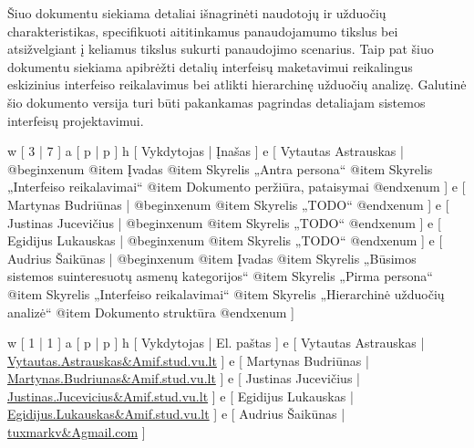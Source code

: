 
Šiuo dokumentu siekiama detaliai išnagrinėti naudotojų ir
užduočių charakteristikas, specifikuoti aititinkamus panaudojamumo
tikslus bei atsižvelgiant į keliamus tikslus sukurti panaudojimo
scenarius. Taip pat šiuo dokumentu siekiama apibrėžti detalių
interfeisų maketavimui reikalingus eskizinius interfeiso reikalavimus
bei atlikti hierarchinę užduočių analizę. Galutinė šio dokumento
versija turi būti pakankamas pagrindas detaliajam sistemos interfeisų
projektavimui.

\xtable
{
  w [ 3  | 7 ]
  a [ p  | p ]
  h [ Vykdytojas | Įnašas ]
  e [ Vytautas Astrauskas
  | @begin{xenum} 
      @item Įvadas
      @item Skyrelis „Antra persona“
      @item Skyrelis „Interfeiso reikalavimai“
      @item Dokumento peržiūra, pataisymai
    @end{xenum}
  ]
  e [ Martynas Budriūnas
  | @begin{xenum} 
      @item Skyrelis „TODO“
    @end{xenum}
  ]
  e [ Justinas Jucevičius 
  | @begin{xenum} 
      @item Skyrelis „TODO“
    @end{xenum}
  ]
  e [ Egidijus Lukauskas 
  | @begin{xenum} 
      @item Skyrelis „TODO“
    @end{xenum}
  ]
  e [ Audrius Šaikūnas 
  | @begin{xenum} 
      @item Įvadas
      @item Skyrelis „Būsimos sistemos suinteresuotų asmenų kategorijos“
      @item Skyrelis „Pirma persona“
      @item Skyrelis „Interfeiso reikalavimai“
      @item Skyrelis „Hierarchinė užduočių analizė“
      @item Dokumento struktūra
    @end{xenum}
  ]
}

\xtableu
{
  w [ 1 | 1 ]
  a [ p | p ]
  h [ Vykdytojas | El. paštas ]
  e [ Vytautas Astrauskas | \url{Vytautas.Astrauskas&Amif.stud.vu.lt} ]
  e [ Martynas Budriūnas  | \url{Martynas.Budriunas&Amif.stud.vu.lt} ]
  e [ Justinas Jucevičius | \url{Justinas.Jucevicius&Amif.stud.vu.lt} ]
  e [ Egidijus Lukauskas  | \url{Egidijus.Lukauskas&Amif.stud.vu.lt} ]
  e [ Audrius Šaikūnas    | \url{tuxmarkv&Agmail.com} ]
}
